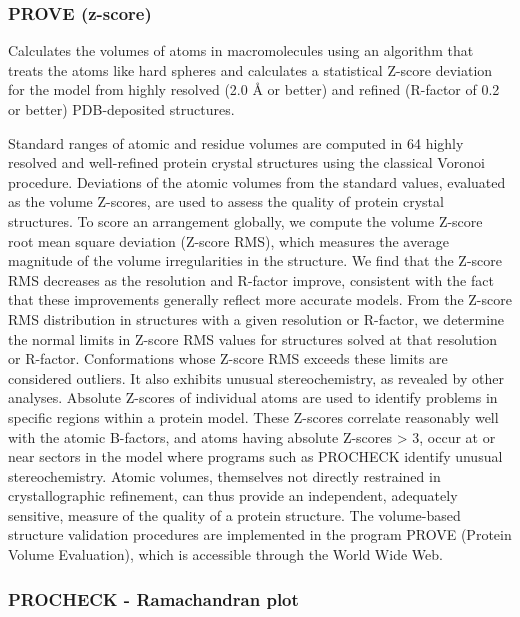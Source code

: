 \documentclass[11pt, letterpaper, english]{article}
\begin{document}
\subsubsection{PROVE (z-score)}

    \par{Calculates the volumes of atoms in macromolecules using an algorithm that treats the atoms like hard spheres and calculates a statistical Z-score deviation for the model from highly resolved (2.0 Å or better) and refined (R-factor of 0.2 or better) PDB-deposited structures.}

    \par{Standard ranges of atomic and residue volumes are computed in 64 highly resolved and well-refined protein crystal structures using the classical Voronoi procedure. Deviations of the atomic volumes from the standard values, evaluated as the volume Z-scores, are used to assess the quality of protein crystal structures. To score an arrangement globally, we compute the volume Z-score root mean square deviation (Z-score RMS), which measures the average magnitude of the volume irregularities in the structure. We find that the Z-score RMS decreases as the resolution and R-factor improve, consistent with the fact that these improvements generally reflect more accurate models. From the Z-score RMS distribution in structures with a given resolution or R-factor, we determine the normal limits in Z-score RMS values for structures solved at that resolution or R-factor. Conformations whose Z-score RMS exceeds these limits are considered outliers. It also exhibits unusual stereochemistry, as revealed by other analyses. Absolute Z-scores of individual atoms are used to identify problems in specific regions within a protein model. These Z-scores correlate reasonably well with the atomic B-factors, and atoms having absolute Z-scores > 3, occur at or near sectors in the model where programs such as PROCHECK identify unusual stereochemistry. Atomic volumes, themselves not directly restrained in crystallographic refinement, can thus provide an independent, adequately sensitive, measure of the quality of a protein structure. The volume-based structure validation procedures are implemented in the program PROVE (Protein Volume Evaluation), which is accessible through the World Wide Web.}

\subsubsection{PROCHECK -  Ramachandran plot}
\end{document}

